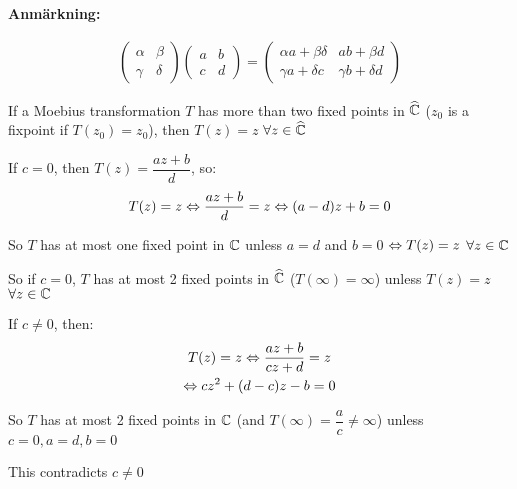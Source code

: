 \noindent\textbf{Anmärkning:}\par
\begin{equation*}
  \begin{gathered}
    \begin{pmatrix}\alpha&\beta\\\gamma&\delta\end{pmatrix}\begin{pmatrix}a&b\\c&d\end{pmatrix} = \begin{pmatrix}\alpha a+\beta\delta&ab+\beta d\\\gamma a+\delta c &\gamma b+\delta d\end{pmatrix}
  \end{gathered}
\end{equation*}
\par\bigskip
\begin{lem}[]{}
  If a Moebius transformation $T$ has more than two fixed points in $\widehat{\mathbb{C}}$ ($z_0$ is a fixpoint if $T(z_0) = z_0$), then $T(z) = z$ $\forall z\in\widehat{\mathbb{C}}$
\end{lem}
\newpage
\begin{prf}[]{}
  If $c=0$, then $T(z) = \dfrac{az+b}{d}$, so:
  \begin{equation*}
    \begin{gathered}
      T(z) = z\Leftrightarrow \dfrac{az+b}{d}=z\Leftrightarrow (a-d)z+b = 0
    \end{gathered}
  \end{equation*}\par
  \noindent So $T$ has at most one fixed point in $\mathbb{C}$ unless $a = d$ and $b=0$ $\Leftrightarrow T(z) = z$ $\forall z\in\mathbb{C}$
  \par\bigskip
  \noindent So if $c=0$, $T$ has at most 2 fixed points in $\widehat{\mathbb{C}}$ ($T(\infty) = \infty$) unless $T(z) = z$  $\forall z\in\mathbb{C}$
  \par\bigskip
  \noindent If $c\neq0$, then:
  \begin{equation*}
    \begin{gathered}
      T(z) = z \Leftrightarrow \dfrac{az+b}{cz+d} = z\\
      \Leftrightarrow cz^2+(d-c)z-b=0
    \end{gathered}
  \end{equation*}
  \par\bigskip
  \noindent So $T$ has at most 2 fixed points in $\mathbb{C}$ (and $T(\infty) = \dfrac{a}{c}\neq\infty$) unless $c=0,a=d,b=0$\par
  \noindent This contradicts $c\neq0$
\end{prf}
